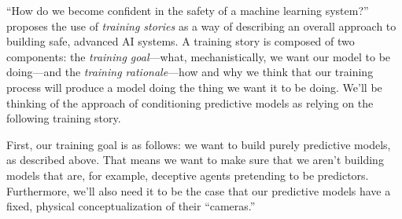 {``How do we become confident in the safety of a machine learning system?\cite{TODO: cite https://www.alignmentforum.org/posts/FDJnZt8Ks2djouQTZ/how-do-we-become-confident-in-the-safety-of-a-machine}'' proposes the use of \textit{training stories} as a way of describing an overall approach to building safe, advanced AI systems. A training story is composed of two components: the \textit{training goal}---what, mechanistically, we want our model to be doing---and the \textit{training rationale}---how and why we think that our training process will produce a model doing the thing we want it to be doing. We'll be thinking of the approach of conditioning predictive models as relying on the following training story.

First, our training goal is as follows: we want to build purely predictive models, as described above. That means we want to make sure that we aren't building models that are, for example, deceptive agents\cite{TODO: cite https://www.alignmentforum.org/posts/A9NxPTwbw6r6Awuwt/how-likely-is-deceptive-alignment} pretending to be predictors. Furthermore, we'll also need it to be the case that our predictive models have a fixed, physical conceptualization of their ``cameras.''

}
